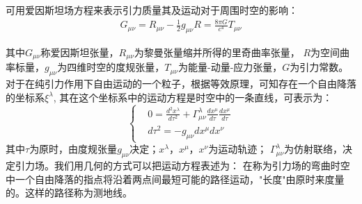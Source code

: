\documentclass{ctexart}
\begin{document}
\par 可用爱因斯坦场方程来表示引力质量其及运动对于周围时空的影响：
\begin{equation}
  \begin{aligned}
  G_{\mu \nu} =R_{\mu \nu} -\frac{1}{2} g_{\mu \nu} R =\frac{8\pi G}{c^4} T_{\mu \nu}
  \end{aligned}
\end{equation}
\par 其中$G_{\mu \nu}$称爱因斯坦张量，$R_{\mu \nu}$为黎曼张量缩并所得的里奇曲率张量，
$R$为空间曲率标量，$g_{\mu \nu}$为四维时空的度规张量，$T_{\mu \nu}$为能量-动量-应力张量，$G$为引力常数。
	对于在纯引力作用下自由运动的一个粒子，根据等效原理，可知存在一个自由降落的坐标系$\xi^\lambda$,
其在这个坐标系中的运动方程是时空中的一条直线，可表示为：
\begin{equation}
    \left\{
    \begin{aligned}
    &0=\frac{d^2 x^\lambda}{d\tau ^2}+\Gamma^\lambda_{\mu \nu}\frac{dx^\mu}{d\tau}\frac{dx^\mu}{d\tau} \\
    &d\tau^2=-g_{\mu\nu}dx^\mu dx^\nu
    \end{aligned}
    \right.
\end{equation}
	其中$\tau$为原时，由度规张量$g_{\mu \nu}$决定；$x^\lambda$，$x^\mu$，$x^\nu$为运动轨迹；
$\Gamma_{\mu \nu}^\lambda$为仿射联络，决定引力场。我们用几何的方式可以把运动方程表述为：
在称为引力场的弯曲时空中一个自由降落的指点将沿着两点间最短可能的路径运动，"长度"由原时来度量的。这样的路径称为测地线。
\end{document}

